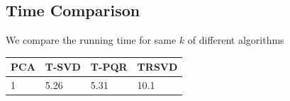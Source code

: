\documentclass[english]{article}
\newcommand{\<}{\langle}
\renewcommand{\>}{\rangle}
\theoremstyle{definition}
\begin{document}
\subsection{Time Comparison}
We compare the running time for same $k$ of different algorithms
\begin{table}[H]
	\centering
	\begin{tabular}{llll}
		\hline
		PCA & T-SVD & T-PQR & TRSVD \\
		\hline
		1   & 5.26  & 5.31  & 10.1 
	\end{tabular}
\end{table}
\newpage
\nocite{*}


\end{document}
